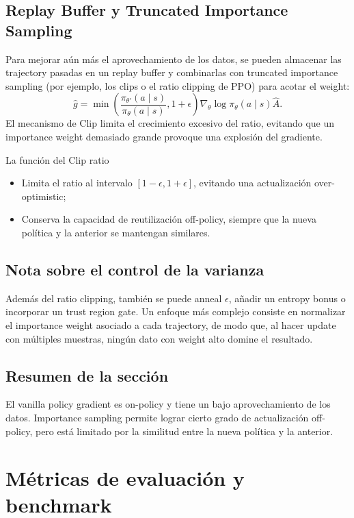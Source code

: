 \documentclass[a4paper]{article}
\begin{document}
\subsection{Replay Buffer y Truncated Importance Sampling}
Para mejorar aún más el aprovechamiento de los datos, se pueden almacenar las trajectory pasadas en un replay buffer y combinarlas con truncated importance sampling (por ejemplo, los clips o el ratio clipping de PPO) para acotar el weight:
$$\hat{g} = \min\left(\frac{\pi_{\theta'}(a\mid s)}{\pi_\theta(a\mid s)}, 1+\epsilon\right) \nabla_\theta \log \pi_\theta(a\mid s) \hat{A}.$$
El mecanismo de Clip limita el crecimiento excesivo del ratio, evitando que un importance weight demasiado grande provoque una explosión del gradiente.

\begin{importantbox}{La función del Clip ratio}
\begin{itemize}
    \item Limita el ratio al intervalo $[1-\epsilon,1+\epsilon]$, evitando una actualización over-optimistic;
    \item Conserva la capacidad de reutilización off-policy, siempre que la nueva política y la anterior se mantengan similares.
\end{itemize}
\end{importantbox}

\subsection{Nota sobre el control de la varianza}
Además del ratio clipping, también se puede anneal $\epsilon$, añadir un entropy bonus o incorporar un trust region gate. Un enfoque más complejo consiste en normalizar el importance weight asociado a cada trajectory, de modo que, al hacer update con múltiples muestras, ningún dato con weight alto domine el resultado.

\subsection{Resumen de la sección}

El vanilla policy gradient es on-policy y tiene un bajo aprovechamiento de los datos. Importance sampling permite lograr cierto grado de actualización off-policy, pero está limitado por la similitud entre la nueva política y la anterior.
\section{Métricas de evaluación y benchmark}
\end{document}
